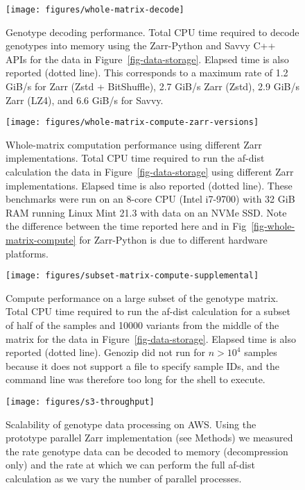 \documentclass[a4paper,num-refs]{oup-contemporary}
\begin{document}
\begin{figure}[h]
\texttt{[image: figures/whole-matrix-decode]}
\caption{Genotype decoding performance.
Total CPU time required to decode genotypes into memory using the Zarr-Python
and Savvy C++ APIs for the data in Figure~\ref{fig-data-storage}.
Elapsed time is also reported (dotted line).
This corresponds to a maximum rate of 1.2 GiB/s for Zarr (Zstd + BitShuffle),
2.7 GiB/s Zarr (Zstd), 2.9 GiB/s Zarr (LZ4), and 6.6 GiB/s for Savvy.
\label{fig-whole-matrix-decode}}
\end{figure}

\begin{figure}[h]
\texttt{[image: figures/whole-matrix-compute-zarr-versions]}
\caption{Whole-matrix computation performance using different Zarr
implementations.
Total CPU time required to run the af-dist calculation
the data in Figure~\ref{fig-data-storage} using different Zarr implementations.
Elapsed time is also reported (dotted line).
These benchmarks were run on an 8-core CPU (Intel i7-9700) with 32 GiB RAM running
Linux Mint 21.3 with data on an NVMe SSD.
Note the difference between the
time reported here and in Fig~\ref{fig-whole-matrix-compute} for Zarr-Python
is due to different hardware platforms.
\label{fig-whole-matrix-compute-zarr-versions}}
\end{figure}

\begin{figure}[h]
\texttt{[image: figures/subset-matrix-compute-supplemental]}
\caption{Compute performance on a large subset of the genotype matrix.
Total CPU time required to run the af-dist calculation for
a subset of half of the samples and 10000 variants from the middle of the matrix
for the data in Figure~\ref{fig-data-storage}.
Elapsed time is also reported (dotted line).
Genozip did not run for
$n > 10^4$ samples because it does not support a file to specify
sample IDs, and the command line was therefore too long for the shell
to execute.
\label{fig-subset-matrix-compute-supplemental}}
\end{figure}

\begin{figure}[h]
\texttt{[image: figures/s3-throughput]}
\caption{Scalability of genotype data processing on AWS.
Using the prototype parallel Zarr implementation (see Methods) we 
measured the rate genotype data can be decoded to memory (decompression
only) and the rate at which we can perform the full af-dist
calculation as we vary the number of parallel processes.
\label{fig-s3-throughput}}
\end{figure}
\end{document}
